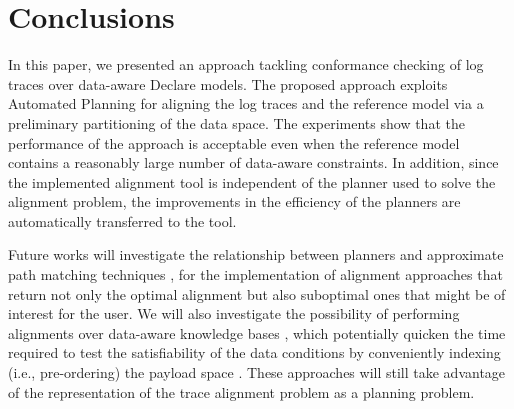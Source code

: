 \section{Conclusions}\label{sec:end}
In this paper, we presented an approach tackling conformance checking of log traces over data-aware Declare models. The proposed approach exploits Automated Planning for aligning the log traces and the reference model via a preliminary partitioning of the data space. The experiments show that the performance of the approach is acceptable even when the reference model contains a reasonably large number of data-aware constraints. In addition, since the implemented alignment tool is independent of the planner used to solve the alignment problem, the improvements in the efficiency of the planners are automatically transferred to the tool.

Future works will investigate the relationship between planners and approximate path matching techniques \cite{Myers1989}, for the implementation of alignment approaches that return not only the optimal alignment but also suboptimal ones that might be of interest for the user. We will also investigate the possibility of performing alignments over data-aware knowledge bases \cite{10.1007/978-3-319-39696-5_18}, which potentially quicken the time required to test the satisfiability of the data conditions by conveniently indexing (i.e., pre-ordering) the payload space \cite{IdreosGNMMK12}. These approaches will still take advantage of the representation of the trace alignment problem as a planning problem. 